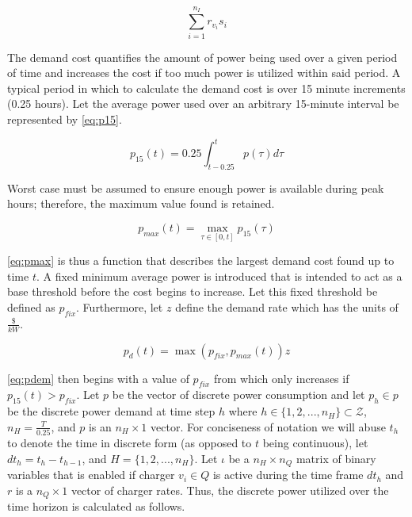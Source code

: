\documentclass[11pt,a4paper,final]{article}
\newcommand{\Qset}{Q}                       %
\newcommand{\Hset}{H}                       %
\begin{document}
\begin{equation}
\label{eq:consumption-cost}
  \sum_{i=1}^{n_I} r_{v_i}s_i
\end{equation}

The demand cost quantifies the amount of power being used over a given period of time and increases the cost if too much
power is utilized within said period. A typical period in which to calculate the demand cost is over 15 minute
increments (0.25 hours). Let the average power used over an arbitrary 15-minute interval be represented by \ref{eq:p15}.

\begin{equation}
\label{eq:p15}
p_{15}(t) = 0.25 \int_{t-0.25}^{t} p(\tau) d\tau
\end{equation}

Worst case must be assumed to ensure enough power is available during peak hours; therefore, the maximum value found is
retained.

\begin{equation}
\label{eq:pmax}
p_{max}(t) = \max\limits_{\tau \in [0,t]}p_{15}(\tau)
\end{equation}

\ref{eq:pmax} is thus a function that describes the largest demand cost found up to time \(t\). A fixed minimum average power is
introduced that is intended to act as a base threshold before the cost begins to increase. Let this fixed threshold be
defined as \(p_{fix}\). Furthermore, let \(z\) define the demand rate which has the units of \(\frac{\$}{kW}\).

\begin{equation}
\label{eq:pdem}
p_d(t) = \max(p_{fix},p_{max}(t))z
\end{equation}

\ref{eq:pdem} then begins with a value of \(p_{fix}\) from which only increases if \(p_{15}(t) > p_{fix}\). Let \(p\) be the vector
of discrete power consumption and let \(p_h \in p\) be the discrete power demand at time step \(h\) where \(h \in \{ 1, 2, ...,
n_H \} \subset \mathcal{Z}\), \(n_H = \frac{T}{0.25}\), and \(p\) is an \(n_H \times 1\) vector. For conciseness of notation we will abuse \(t_h\) to
denote the time in discrete form (as opposed to \(t\) being continuous), let \(dt_h = t_h - t_{h-1}\), and \(\Hset = \{ 1, 2,
..., n_H \}\). Let \(\iota\) be a \(n_H \times n_Q\) matrix of binary variables that is enabled if charger \(v_i \in \Qset\) is active
during the time frame \(dt_h\) and \(r\) is a \(n_Q \times 1\) vector of charger rates. Thus, the discrete power utilized over the
time horizon is calculated as follows.
\end{document}
